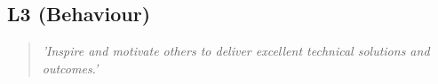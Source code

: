 \subsection{L3 (Behaviour)}

  \begin{quote}
    \textit{'Inspire and motivate others to deliver
    excellent technical solutions and outcomes.'}
  \end{quote}

\newpage